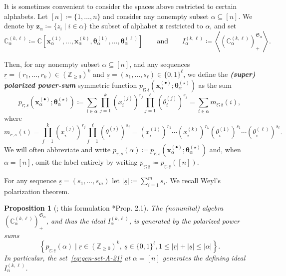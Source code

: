 \documentclass[11pt, reqno]{amsart}
\newtheorem{proposition}[theorem]{Proposition}
\theoremstyle{definition}
\theoremstyle{remark}
\numberwithin{equation}{section}
\newcommand{\0}{\emptyset}
\newcommand{\Z}{\mathbb{Z}}
\newcommand{\C}{\mathbb{C}}
\renewcommand{\S}{\mathfrak{S}}
\renewcommand{\r}{\underline{r}}
\newcommand{\s}{\underline{s}}
\newcommand{\newword}[1]{\emph{\textbf{#1}}}
\begin{document}
It is sometimes convenient to consider the spaces above restricted to certain alphabets. 
Let $[n] \coloneqq \{1,\ldots, n\}$ and consider any nonempty subset $\alpha \subseteq [n]$. 
We denote by
$\bm{z}_\alpha\coloneqq\{z_i\mid i \in \alpha\}$ the subset of alphabet $\bm{z}$ restricted to $\alpha$, and set
\[
    \C_\alpha^{(k,\ell)} \coloneqq 
    \C\left[\bm{x}_\alpha^{(1)},\ldots,\bm{x}_\alpha^{(k)}, 
    \bm{\theta}_\alpha^{(1)},\ldots,\bm{\theta}_\alpha^{(\ell)}\right]
    \qquad \text{and}\qquad
    I_\alpha^{(k,\ell)} \coloneqq 
    \left\langle\left(\C_\alpha^{(k,\ell)}\right)^{\S_\alpha}_+\right\rangle.
\]

Then, for any nonempty subset $\alpha \subseteq [n]$, and any sequences $\r = (r_1,\ldots,r_k) \in (\Z_{\geq 0})^k$ and $\s= (s_1,\ldots,s_\ell) \in \{0,1\}^\ell$, we define the 
\newword{(super) polarized power-sum} symmetric function 
$p_{\r;\s}(\bm{x}^{(\bullet)}_\alpha;\bm\theta^{(\star)}_\alpha)$ as the sum 
\[
    p_{\r;\s}\left(\bm{x}^{(\bullet)}_\alpha;\bm\theta^{(\star)}_\alpha\right) 
    \coloneqq 
    \sum_{i \in \alpha} \prod_{j=1}^k\left(x_i^{(j)}\right)^{r_j} 
    \prod_{j=1}^\ell\left(\theta_i^{(j)}\right)^{s_j} 
    = \sum_{i \in \alpha}  m_{\r;\s}(i), 
\]
where
\[
    m_{\r;\s}(i) = 
    \prod_{j=1}^k\left(x_i^{(j)}\right)^{r_j} 
    \prod_{j=1}^\ell\left(\theta_i^{(j)}\right)^{s_j} 
    = 
    \left(x_i^{(1)}\right)^{r_1} \cdots \left(x_i^{(k)}\right)^{r_k} 
    \left(\theta_i^{(1)}\right)^{s_1} \cdots \left(\theta_i^{(\ell)}\right)^{s_\ell}. 
\]
We will often abbreviate and write 
$p_{\r;\s}(\alpha)\coloneqq  
p_{\r;\s}\left(\bm{x}^{(\bullet)}_\alpha;\bm\theta^{(\star)}_\alpha\right)$ 
and, when $\alpha = [n]$, omit the label entirely 
by writing $p_{\r;\s}\coloneqq p_{\r;\s}([n])$.

For any sequence $\s=(s_1,\ldots,s_m)$ let $|\s|\coloneqq \sum_{i=1}^m s_i$. 
We recall Weyl's polarization theorem.
\begin{proposition}[\cite{Weyl}; this formulation \cite{JiangLentfer}*{Prop. 2.1}]
\label{prop:ideal-generators}
    The (nonunital) algebra $(\C^{(k,\ell)}_\alpha)_+^{\S_\alpha}$, and thus the ideal
    $I_\alpha^{(k,\ell)}$,
    is generated by the polarized power sums 
    \begin{equation}\label{eq:gen-set-A-21}
        \left\{ p_{\r;\s}(\alpha) \mid
        \r \in (\Z_{\geq 0})^k,\ \s \in \{0,1\}^\ell, 1 \leq |\r|+|\s| \leq |\alpha| \right\}.
\end{equation}
    In particular, the set~\eqref{eq:gen-set-A-21} at $\alpha = [n]$ 
    generates the defining ideal $I_{n}^{(k,\ell)}$. 
\end{proposition}
\end{document}
